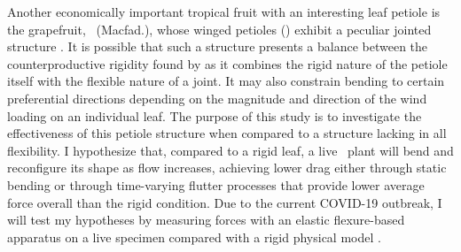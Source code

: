 Another economically important tropical fruit with an interesting leaf petiole is the grapefruit, \Citrusxparadisi\ (Macfad.), whose winged petioles () exhibit a peculiar jointed structure \citep{morton1987grapefruit, kumamoto1987mystery, macfayden1837flora}. It is possible that such a structure presents a balance between the counterproductive rigidity found by \citet{miller2012reconfiguration} as it combines the rigid nature of the petiole itself with the flexible nature of a joint. It may also constrain bending to certain preferential directions depending on the magnitude and direction of the wind loading on an individual leaf. The purpose of this study is to investigate the effectiveness of this petiole structure when compared to a structure lacking in all flexibility. I hypothesize that, compared to a rigid leaf, a live \Cxparadisi\ plant will bend and reconfigure its shape as flow increases, achieving lower drag either through static bending or through time-varying flutter processes that provide lower average force overall than the rigid condition. Due to the current COVID-19 outbreak, I will test my hypotheses by measuring forces with an elastic flexure-based apparatus \citep{denny1983simple, bell1984quantifying} on a live specimen compared with a rigid physical model \citep{stevenson2015when, evangelista2014shifts, stewart2006hydrodynamic, vogel2009leaves}. 

